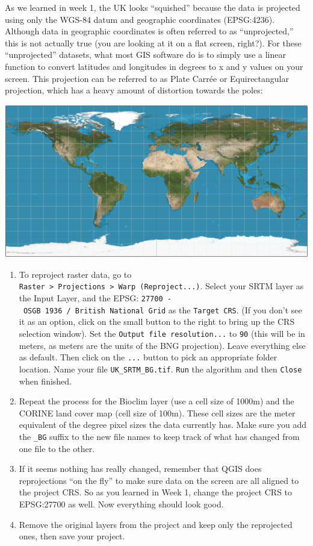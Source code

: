 \documentclass[
  letterpaper,
  DIV=11,
  numbers=noendperiod]{scrreprt}
\begin{document}
As we learned in week 1, the UK looks ``squished'' because the data is
projected using only the WGS-84 datum and geographic coordinates
(EPSG:4236). Although data in geographic coordinates is often referred
to as ``unprojected,'' this is not actually true (you are looking at it
on a flat screen, right?). For these ``unprojected'' datasets, what most
GIS software do is to simply use a linear function to convert latitudes
and longitudes in degrees to x and y values on your screen. This
projection can be referred to as Plate Carrée or Equirectangular
projection, which has a heavy amount of distortion towards the poles:

\includegraphics{images/lab_5/lab5_fig1_Equirectangular_projection_SW.jpg}

\begin{enumerate}
\def\labelenumi{(\arabic{enumi})}
\setcounter{enumi}{119}
\item
  To reproject raster data, go to
  \texttt{Raster\ \textgreater{}\ Projections\ \textgreater{}\ Warp\ (Reproject...)}.
  Select your SRTM layer as the Input Layer, and the EPSG:
  \texttt{27700\ -\ OSGB\ 1936\ /\ British\ National\ Grid} as the
  \texttt{Target\ CRS}. (If you don't see it as an option, click on the
  small button to the right to bring up the CRS selection window). Set
  the \texttt{Output\ file\ resolution...} to \texttt{90} (this will be
  in meters, as meters are the units of the BNG projection). Leave
  everything else as default. Then click on the \texttt{...} button to
  pick an appropriate folder location. Name your file
  \texttt{UK\_SRTM\_BG.tif}. \texttt{Run} the algorithm and then
  \texttt{Close} when finished.
\item
  Repeat the process for the Bioclim layer (use a cell size of 1000m)
  and the CORINE land cover map (cell size of 100m). These cell sizes
  are the meter equivalent of the degree pixel sizes the data currently
  has. Make sure you add the \texttt{\_BG} suffix to the new file names
  to keep track of what has changed from one file to the other.
\item
  If it seems nothing has really changed, remember that QGIS does
  reprojections ``on the fly'' to make sure data on the screen are all
  aligned to the project CRS. So as you learned in Week 1, change the
  project CRS to EPSG:27700 as well. Now everything should look good.
\item
  Remove the original layers from the project and keep only the
  reprojected ones, then save your project.
\end{enumerate}
\end{document}
